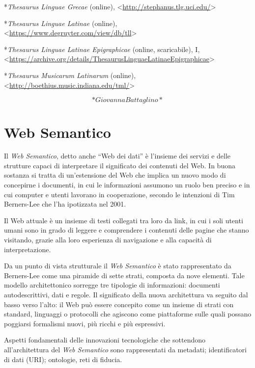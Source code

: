 \documentclass[
  b5paper,
  twoside,
  11pt,
  chapterprefix=false,
  bibliography=totocnumbered,
  parskip=0]{scrbook}
\begin{document}
*\emph{Thesaurus Linguae Grecae} (online),
\textless{}\href{http://stephanus.tlg.uci.edu/}{{http://stephanus.tlg.uci.edu/}}\textgreater{}

*\emph{Thesaurus Linguae Latinae} (online),
\textless{}\href{https://www.degruyter.com/view/db/tll}{{https://www.degruyter.com/view/db/tll}}\textgreater{}

*\emph{Thesaurus Linguae Latinae Epigraphicae} (online, scaricabile), I,
\textless{}\href{https://archive.org/details/ThesaurusLinguaeLatinaeEpigraphicae}{{https://archive.org/details/ThesaurusLinguaeLatinaeEpigraphicae}}\textgreater{}

*\emph{Thesaurus Musicarum Latinarum} (online),
\textless{}\href{http://boethius.music.indiana.edu/tml/}{{http://boethius.music.indiana.edu/tml/}}\textgreater{}

\[*Giovanna Battaglino*\]

\hypertarget{web-semantico}{%
\chapter{Web Semantico}\label{web-semantico}}

Il \emph{Web Semantico}, detto anche \enquote{Web dei dati} è l'insieme dei servizi
e delle strutture capaci di interpretare il significato dei contenuti
del Web. In buona sostanza si tratta di un'estensione del Web che
implica un nuovo modo di concepirne i documenti, in cui le informazioni
assumono un ruolo ben preciso e in cui computer e utenti lavorano in
cooperazione, secondo le intenzioni di Tim Berners-Lee che l'ha
ipotizzata nel 2001.

Il Web attuale è un insieme di testi collegati tra loro da link, in cui
i soli utenti umani sono in grado di leggere e comprendere i contenuti
delle pagine che stanno visitando, grazie alla loro esperienza di
navigazione e alla capacità di interpretazione.

Da un punto di vista strutturale il \emph{Web Semantico} è stato
rappresentato da Berners-Lee come una piramide di sette strati, composta
da nove elementi. Tale modello architettonico sorregge tre tipologie di
informazioni: documenti autodescrittivi, dati e regole. Il significato
della nuova architettura va seguito dal basso verso l'alto: il Web può
essere concepito come un insieme di strati con standard, linguaggi o
protocolli che agiscono come piattaforme sulle quali possano poggiarsi
formalismi nuovi, più ricchi e più espressivi.

Aspetti fondamentali delle innovazioni tecnologiche che sottendono
all'architettura del \emph{Web Semantico} sono rappresentati da metadati;
identificatori di dati (URI); ontologie, reti di fiducia.
\end{document}
